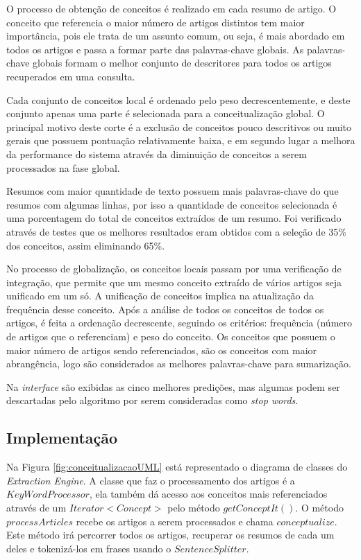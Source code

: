 O processo de obtenção de conceitos é realizado em cada resumo de artigo. O conceito que referencia o maior número de artigos distintos tem maior importância, pois ele trata de um assunto comum, ou seja, é mais abordado em todos os artigos e passa a formar parte das palavras-chave globais. As palavras-chave globais formam o melhor conjunto de descritores para todos os artigos recuperados em uma consulta.

Cada conjunto de conceitos local é ordenado pelo peso decrescentemente, e deste conjunto apenas uma parte é selecionada para a conceitualização global. O principal motivo deste corte é a exclusão de conceitos pouco descritivos ou muito gerais que possuem pontuação relativamente baixa, e em segundo lugar a melhora da performance do sistema através da diminuição de conceitos a serem processados na fase global.

Resumos com maior quantidade de texto possuem mais palavras-chave do que resumos com algumas linhas, por isso a quantidade de conceitos selecionada é uma porcentagem do total de conceitos extraídos de um resumo. Foi verificado através de testes que os melhores resultados eram obtidos com a seleção de 35\% dos conceitos, assim eliminando 65\%.

No processo de globalização, os conceitos locais passam por uma verificação de integração, que permite que um mesmo conceito extraído de vários artigos seja unificado em um só. A unificação de conceitos implica na atualização da frequência desse conceito. Após a análise de todos os conceitos de todos os artigos, é feita a ordenação decrescente, seguindo os critérios: frequência (número de artigos que o referenciam) e peso do conceito. Os conceitos que possuem o maior número de artigos sendo referenciados, são os conceitos com maior abrangência, logo são considerados as melhores palavras-chave para sumarização.

Na \emph{interface} são exibidas as cinco melhores predições, mas algumas podem ser descartadas pelo algoritmo por serem consideradas como \emph{stop words}.

\subsection{Implementação}
Na Figura \ref{fig:conceitualizacaoUML} está representado o diagrama de classes do \emph{Extraction Engine}.
A classe que faz o processamento dos artigos é a $KeyWordProcessor$, ela também dá acesso aos conceitos mais referenciados através de um $Iterator<Concept>$ pelo método $getConceptIt()$. O método $processArticles$ recebe os artigos a serem processados e chama $conceptualize$. Este método irá percorrer todos os artigos, recuperar os resumos de cada um deles e tokenizá-los em frases usando o $SentenceSplitter$.

